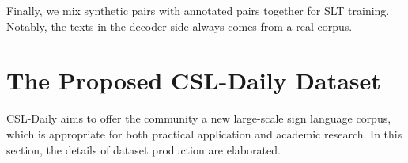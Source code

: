 \documentclass[final]{cvpr}
\begin{document}
Finally, we mix synthetic pairs  with annotated pairs  together for SLT training. Notably, the texts in the decoder side always comes from a real corpus. 



\section{The Proposed CSL-Daily Dataset} \label{sec:CSL-Daily}

\begin{table}[tp]
   \centering
   \footnotesize
   \caption{Key statistics of the CSL-Daily split. 
   (OOV: out-of-vocabulary, \eg, words that occur in Dev set but not in Train set. Singleton: words that only occur once in Train unique sentences.)} \label{tab:csl-daily}
\vspace{-8pt}
\end{table}


CSL-Daily aims to offer the community a new large-scale sign language corpus, 
which is appropriate for both practical application and academic research. 
In this section, the details of dataset production are elaborated. 
\end{document}
